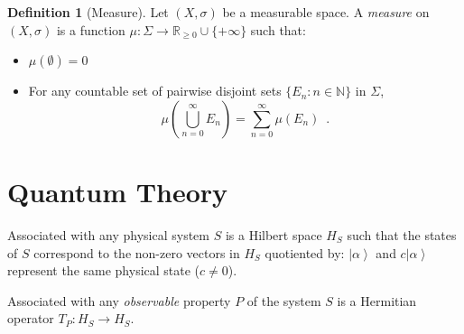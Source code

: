 \documentclass{book}
\theoremstyle{definition}
\newtheorem{df}[prop]{Definition}
\newcommand{\ket}[1]{\ensuremath{\left| {#1} \right\rangle}}
\begin{document}
\begin{df}[Measure]
Let $(X, \sigma)$ be a measurable space. A \emph{measure} on $(X, \sigma)$ is a function $\mu : \Sigma \rightarrow \mathbb{R}_{\geq 0} \cup \{ + \infty \}$ such that:
\begin{itemize}
\item $\mu(\emptyset) = 0$
\item For any countable set of pairwise disjoint sets $\{ E_n : n \in \mathbb{N} \}$ in $\Sigma$,
\[ \mu \left( \bigcup_{n=0}^\infty E_n \right) = \sum_{n=0}^\infty \mu(E_n) \enspace . \]
\end{itemize}
\end{df}

\part{Quantum Theory}

Associated with any physical system $S$ is a Hilbert space $H_S$ such that the states of $S$ correspond to the non-zero vectors in $H_S$ quotiented by: $\ket{\alpha}$ and $c \ket{\alpha}$ represent the same physical state ($c \neq 0$).

Associated with any \emph{observable} property $P$ of the system $S$ is a Hermitian operator $T_P : H_S \rightarrow H_S$.
\end{document}
